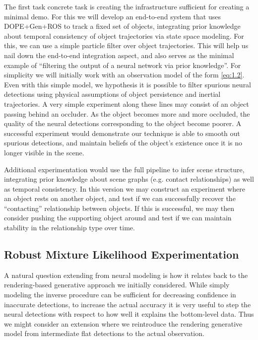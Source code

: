     The first task concrete task is creating the infrastructure sufficient for
    creating a minimal demo. For this we will develop an end-to-end system that
    uses DOPE+Gen+ROS to track a fixed set of objects, integrating prior
    knowledge about temporal consistency of object trajectories via state space
    modeling. For this, we can use a simple particle filter over object
    trajectories. This will help us nail down the end-to-end integration
    aspect, and also serves as the minimal example of ``filtering the output of
    a neural network via prior knowledge''. For simplicity we will initially
    work with an observation model of the form \ref{eq:1.2}. Even with this
    simple model, we hypothesis it is possible to filter spurious neural
    detections using physical assumptions of object persistence and inertial
    trajectories. A very simple experiment along these lines may consist of an
    object passing behind an occluder. As the object becomes more and more
    occluded, the quality of the neural detections corresponding to the object
    become poorer. A successful experiment would demonstrate our technique is
    able to smooth out spurious detections, and maintain beliefs of the
    object's existence once it is no longer visible in the scene.

    Additional experimentation would use the full pipeline to infer scene
    structure, integrating prior knowledge about scene graphs (e.g. contact
    relationships) as well as temporal consistency. In this version we may
    construct an experiment where an object rests on another object, and test
    if we can successfully recover the ``contacting'' relationship between
    objects. If this is successful, we may then consider pushing the supporting
    object around and test if we can maintain stability in the relationship
    type over time.

  \subsection{Robust Mixture Likelihood Experimentation}

    A natural question extending from neural modeling is how it relates back to
    the rendering-based generative approach we initially considered. While
    simply modeling the inverse procedure can be sufficient for decreasing
    confidence in inaccurate detections, to increase the actual accuracy it is
    very useful to step the neural detections with respect to how well it
    explains the bottom-level data. Thus we might consider an extension where
    we reintroduce the rendering generative model from intermediate flat
    detections to the actual observation.

